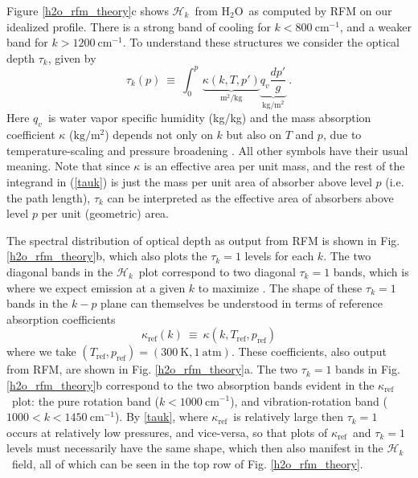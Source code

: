 \documentclass{ametsoc}
\newcommand{\beqn}{\begin{equation}}
\newcommand{\eeqn}{\end{equation}}
\newcommand{\eqnref}[1]{(\ref{#1})}
\newcommand{\kg}{\ensuremath{\mathrm{kg}}}
\newcommand{\meter}{\ensuremath{\mathrm{m}}}
\newcommand{\Kelvin}{\ensuremath{\mathrm{K}}}
\newcommand{\cminverse}{\ensuremath{\mathrm{cm^{-1}}}}
\newcommand{\qv}{\ensuremath{q_v}}
\newcommand{\htwo}{\ensuremath{\mathrm{H_2O}}}
\newcommand{\ch}{\ensuremath{\mathcal{H}}}
\newcommand{\chk}{\ensuremath{\ch_k}}
\newcommand{\tauk}{\ensuremath{\tau_k}}
\newcommand{\kapparef}{\ensuremath{\kappa_{\mathrm{ref}}}}
\newcommand{\Tref}{\ensuremath{T_{\mathrm{ref}}}}
\newcommand{\pref}{\ensuremath{p_{\mathrm{ref}}}}
\begin{document}
Figure \ref{h2o_rfm_theory}c shows \chk\ from \htwo\ as computed by RFM on our idealized profile. There is a strong band of cooling for $k< 800\ \cminverse$, and a weaker band for $k > 1200\ \cminverse$. To understand these structures we consider   the optical depth $\tauk$, given by
\beqn
	\tauk(p) \ \equiv  \ \int_0^p \, \underbrace{\kappa(k,T,p')}_{\meter^2/\kg} \underbrace{\qv \frac{dp'}{g}}_{\kg/\meter^2}\ .
	\label{tauk}
\eeqn
Here \qv\ is water vapor specific humidity (kg/kg) and the mass absorption coefficient $\kappa$ ($\kg/\meter^2$) depends not only on $k$ but also on $T$ and $p$,  due to temperature-scaling and pressure broadening \citep[][]{pierrehumbert2010}. All other symbols have their usual meaning. Note that since $\kappa$ is an effective area per unit mass, and the rest of the integrand in \eqnref{tauk} is just the mass per unit area of absorber above level $p$ (i.e. the path length), $\tauk$ can be interpreted as the effective area of absorbers above level $p$ per unit (geometric) area.

 The spectral distribution of optical depth as output from RFM is shown in Fig. \ref{h2o_rfm_theory}b, which also plots the $\tauk=1$ levels for each $k$. The two diagonal bands in the \chk\ plot correspond to two diagonal $\tauk=1$ bands, which is where we expect emission at a given $k$ to maximize \citep[e.g.][we discuss the basis for this `$\tau=1$ law' below]{petty2006}. The shape of these $\tauk=1$ bands in the $k-p$ plane can themselves be understood in terms of reference absorption coefficients 
 \beqn
  \kapparef(k)\ \equiv  \ \kappa(k,\Tref,\pref)
  \eeqn
  where we take $(\Tref,\pref)=(300\ \Kelvin, 1\ \text{atm})$. These coefficients, also output from RFM, are shown in  Fig. \ref{h2o_rfm_theory}a. The two $\tauk=1$ bands  in Fig. \ref{h2o_rfm_theory}b correspond to the two absorption bands evident in the \kapparef\ plot: the pure rotation band ($k < 1000\ \cminverse$), and vibration-rotation band ($1000 < k< 1450 \ \cminverse$). By \eqref{tauk}, where \kapparef\ is relatively large then $\tauk=1$  occurs at relatively low pressures,  and vice-versa, so that plots of \kapparef\ and $\tauk=1$ levels must necessarily have the same shape, which then also manifest in the \chk\ field, all of which can be seen in the top row of Fig. \ref{h2o_rfm_theory}. 

\end{document}

